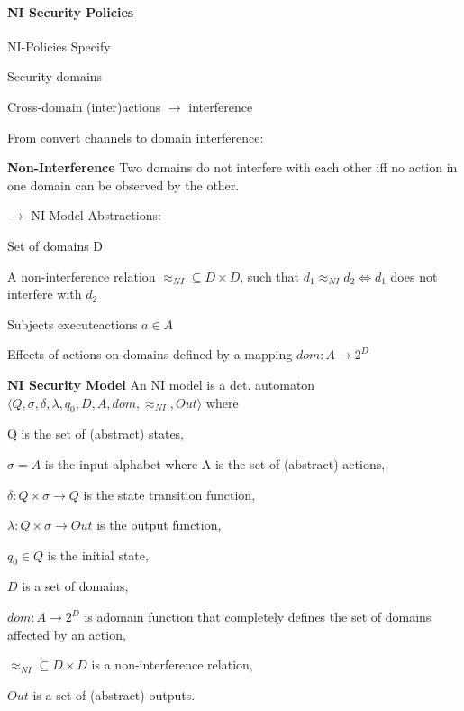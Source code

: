 \documentclass[a4paper]{article}
\renewcommand{\note}[2]{\begin{noteBox} \textbf{#1} #2 \end{noteBox}}
\begin{document}
\begin{multicols}{3}
    \paragraph{NI Security Policies}
    NI-Policies Specify
    \begin{itemize*}
        \item Security domains
        \item Cross-domain (inter)actions $\rightarrow$ interference
    \end{itemize*}
    From convert channels to domain interference:
    \note{Non-Interference}{Two domains do not interfere with each other iff no action in one domain can be observed by the other.}

    $\rightarrow$ NI Model Abstractions:
    \begin{itemize*}
        \item Set of domains D
        \item A non-interference relation $\approx_{NI}\subseteq D\times D$, such that $d_1 \approx_{NI} d_2\Leftrightarrow d_1$ does not interfere with $d_2$
        \item Subjects executeactions $a\in A$
        \item Effects of actions on domains defined by a mapping $dom:A\rightarrow 2^D$
    \end{itemize*}

    \note{NI Security Model}{An NI model is a det. automaton $⟨Q,\sigma,\delta,\lambda,q_0,D,A,dom,\approx_{NI},Out⟩$ where
        \begin{itemize*}
            \item Q is the set of (abstract) states,
            \item $\sigma=A$ is the input alphabet where A is the set of (abstract) actions,
            \item $\delta:Q\times\sigma\rightarrow Q$ is the state transition function,
            \item $\lambda:Q\times\sigma\rightarrow Out$ is the output function,
            \item $q_0\in Q$ is the initial state,
            \item $D$ is a set of domains,
            \item $dom:A\rightarrow 2^D$ is adomain function that completely defines the set of domains affected by an action,
            \item $\approx_{NI}\subseteq D\times D$ is a non-interference relation,
            \item $Out$ is a set of (abstract) outputs.
        \end{itemize*}
    }


\end{multicols}
\end{document}
